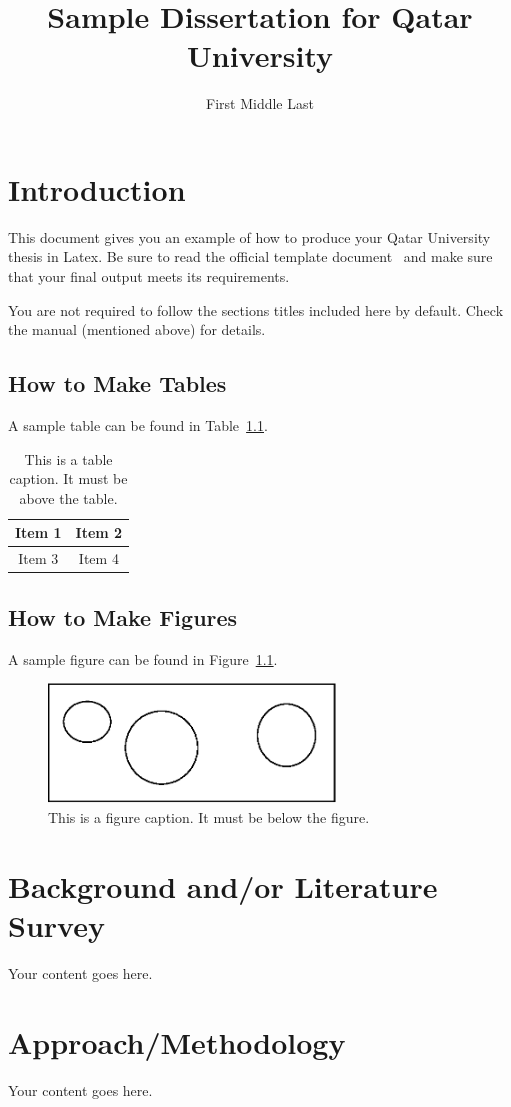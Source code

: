 \documentclass[12pt,lot,lof]{quthesis}
\title{Sample Dissertation for Qatar University}
\author{First Middle Last} %
\begin{document}
\makefrontmatter

\chapter{Introduction}
This document gives you an example of how to produce your Qatar 
University thesis in Latex.  Be sure to read the 
official template document~\cite{qutemp} and make sure that your
final output meets its requirements.

You are not required to follow the sections titles included here by default.
Check the manual (mentioned above) for details.

\section{How to Make Tables}
A sample table can be found in Table~\ref{tab:example}.
\begin{table}[t]
\centering
\caption{This is a table caption.  It must be above the table.}
\begin{tabular}{|c|c|}
\hline
Item 1 & Item 2 \\
\hline
Item 3 & Item 4 \\
\hline
\end{tabular}
\label{tab:example}
\end{table}

\section{How to Make Figures}
A sample figure can be found in Figure~\ref{fig:example}.
\begin{figure}[t]
\centering
\includegraphics[width=3in]{samplefig.eps}
\caption{This is a figure caption.  It must be below the figure.}
\label{fig:example}
\end{figure}

\chapter{Background and/or Literature Survey}
Your content goes here.

\chapter{Approach/Methodology}
Your content goes here.
\end{document}
